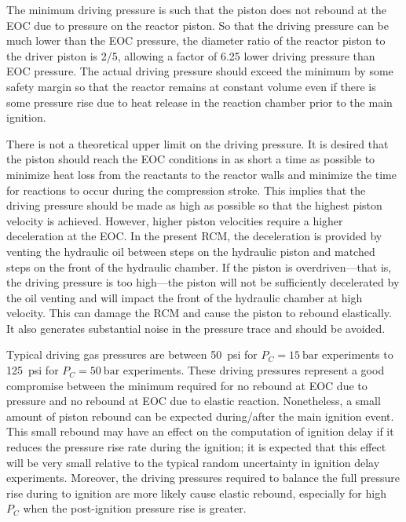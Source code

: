 \documentclass[12pt, letterpaper]{article}
\begin{document}
The minimum driving pressure is such that the piston does not rebound at
the EOC due to pressure on the reactor piston. So that the driving
pressure can be much lower than the EOC pressure, the diameter ratio of
the reactor piston to the driver piston is \num{2/5}, allowing a factor of
\num{6.25} lower driving pressure than EOC pressure. The actual driving
pressure should exceed the minimum by some safety margin so that the
reactor remains at constant volume even if there is some pressure rise
due to heat release in the reaction chamber prior to the main ignition.

There is not a theoretical upper limit on the driving pressure. It is desired that the piston should
reach the EOC conditions in as short a time as possible to minimize heat
loss from the reactants to the reactor walls and minimize the time for
reactions to occur during the compression stroke. This implies that the
driving pressure should be made as high as possible so that the highest
piston velocity is achieved. However, higher piston velocities require
a higher deceleration at the EOC. In the present RCM, the deceleration
is provided by venting the hydraulic oil between steps on the hydraulic
piston and matched steps on the front of the hydraulic chamber. If the
piston is overdriven---that is, the driving pressure is too high---the
piston will not be sufficiently decelerated by the oil venting and will
impact the front of the hydraulic chamber at high velocity. This can damage
the RCM and cause the piston to rebound elastically. It also generates
substantial noise in the pressure trace and should be avoided.

Typical driving gas pressures are between \SI{50}{psi} for $P_C = \SI{15}{\bar}$ experiments
to  \SI{125}{psi} for $P_C = \SI{50}{\bar}$ experiments. These driving pressures represent a
good compromise between the minimum required for no rebound at EOC due
to pressure and no rebound at EOC due to elastic reaction. Nonetheless,
a small amount of piston rebound can be expected during/after the
main ignition event. This small rebound may have an effect on the computation of
ignition delay if it reduces the pressure rise rate during the ignition;
it is expected that this effect will be very small relative to the
typical random uncertainty in ignition delay experiments. Moreover,
the driving pressures required to balance the full pressure rise during
to ignition are more likely cause elastic rebound,
especially for high $P_C$ when the post-ignition pressure rise is greater.
\end{document}
